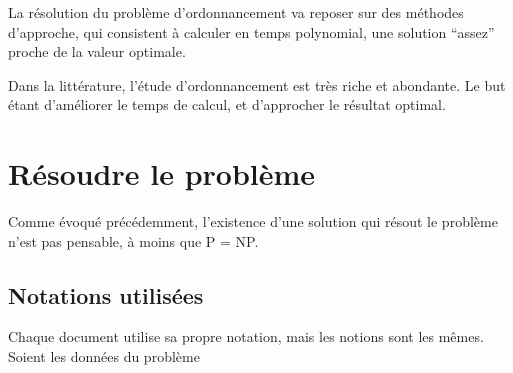 \documentclass[a4paper,12pt]{report}
\theoremstyle{plain}				%
\theoremstyle{definition}				%
\begin{document}
La résolution du problème d'ordonnancement va reposer sur des méthodes
d'approche, qui consistent à calculer en
temps polynomial, une solution ``assez'' proche de la valeur optimale.

Dans la littérature, l'étude d'ordonnancement est très riche et
abondante.
Le but étant d'améliorer le temps de calcul, et d'approcher le
résultat optimal.

\section{Résoudre le problème}

Comme évoqué précédemment, l'existence d'une solution qui résout le
problème n'est pas pensable, à moins que P = NP.

\subsection{Notations utilisées}

Chaque document utilise sa propre notation, mais les notions sont les mêmes.
Soient les données du problème
\end{document}

